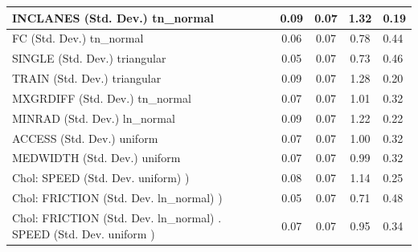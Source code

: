 \begin{table}
\begin{center}
\begin{tabular}{|l|l|c|c|c|l|}
			\hline
			INCLANES (Std. Dev.) tn_normal &  & 0.09 & 0.07 & 1.32 & 0.19 \\
			\hline
			FC (Std. Dev.) tn_normal &  & 0.06 & 0.07 & 0.78 & 0.44 \\
			\hline
			SINGLE (Std. Dev.) triangular &  & 0.05 & 0.07 & 0.73 & 0.46 \\
			\hline
			TRAIN (Std. Dev.) triangular &  & 0.09 & 0.07 & 1.28 & 0.20 \\
			\hline
			MXGRDIFF (Std. Dev.) tn_normal &  & 0.07 & 0.07 & 1.01 & 0.32 \\
			\hline
			MINRAD (Std. Dev.) ln_normal &  & 0.09 & 0.07 & 1.22 & 0.22 \\
			\hline
			ACCESS (Std. Dev.) uniform &  & 0.07 & 0.07 & 1.00 & 0.32 \\
			\hline
			MEDWIDTH (Std. Dev.) uniform &  & 0.07 & 0.07 & 0.99 & 0.32 \\
			\hline
			 Chol: SPEED (Std. Dev. uniform) ) &  & 0.08 & 0.07 & 1.14 & 0.25 \\
			\hline
			 Chol: FRICTION (Std. Dev. ln_normal) ) &  & 0.05 & 0.07 & 0.71 & 0.48 \\
			\hline
			 Chol: FRICTION (Std. Dev. ln_normal) . SPEED (Std. Dev.   uniform ) &  & 0.07 & 0.07 & 0.95 & 0.34 \\
			\hline
		\end{tabular}
	\end{center}
\end{table}